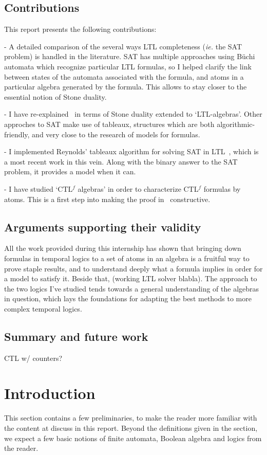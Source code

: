 \documentclass[11pt]{article}
\newcommand{\CTLf}{{CTL$^f$ }}
\begin{document}
\subsection*{Contributions}
This report presents the following contributions:

- A detailed comparison of the several ways LTL completeness
(\emph{ie.} the SAT problem) is handled
in the literature. SAT has 
multiple approaches using Büchi automata which recognize particular
LTL formulas, so I helped clarify the link between states
of the automata associated with the formula,
and atoms in a particular algebra generated by the formula.
This allows to stay closer to the essential notion of Stone duality.

- I have re-explained~\cite{GhivG17}
in terms of Stone duality extended to `LTL-algebras'. Other approches 
to SAT make use of tableaux, structures which are both algorithmic-friendly,
and very close to the research of models for formulas. 

- I implemented Reynolds' tableaux
algorithm for solving SAT in LTL~\cite{ReyLTL}, which is a most recent work in this vein.
Along with the binary answer to the SAT problem, it provides a model when
it can.

- I have studied `{\CTLf}algebras' in order to characterize
{\CTLf}formulas by atoms. This is a first step into making the proof in~\cite{GhivG16} constructive.



\subsection*{Arguments supporting their validity}
All the work provided during this internship has shown that bringing down
formulas in temporal logics to a set of atoms in an algebra is a fruitful
way to prove staple results, and to understand deeply what a formula
implies in order for a model to satisfy it. Beside that, (working LTL solver
blabla). The approach to the two logics I've studied tends towards a general
understanding of the algebras in question, which lays the foundations for
adapting the best methods to more complex temporal logics.



\subsection*{Summary and future work}
CTL w/ counters?

\section{Introduction}
This section contains a few preliminaries, to make the reader more familiar with the
content at discuss in this report. Beyond the definitions given in the section, we expect
a few basic notions of finite automata, Boolean algebra and  logics from the reader.
\end{document}
